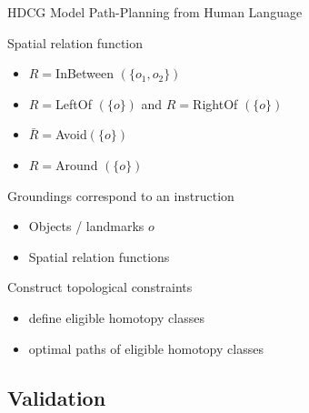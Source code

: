 \begin{frame}{HDCG}{ Model Path-Planning from Human Language }

\begin{block}{Spatial relation function\footnotemark}
\begin{itemize}
\item $ R = ${\sc InBetween }$ ( \{ o_1 , o_2 \} ) $
\item $ R = ${\sc LeftOf }$ ( \{ o \} ) $ and $ R = ${\sc RightOf }$ ( \{ o \} ) $
\item $ \bar{R} = ${\sc Avoid}$ ( \{ o \} )  $
\item $ R = ${\sc Around }$ ( \{ o \} ) $
\end{itemize}
\end{block}

\begin{block}{Groundings correspond to an instruction}
\begin{itemize}
\item Objects / landmarks $ o $
\item Spatial relation functions
\end{itemize}
\end{block}

\begin{block}{Construct topological constraints}
\begin{itemize}
\item define eligible homotopy classes
\item optimal paths of eligible homotopy classes
\end{itemize}
\end{block}


\end{frame}

\subsection{Validation}

